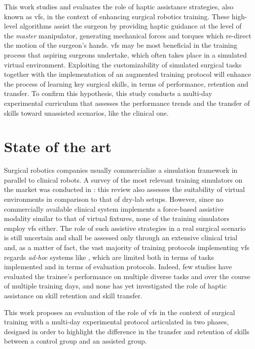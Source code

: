 \documentclass{article}
\begin{document}
\begin{multicols}{2}
This work studies and evaluates the role of haptic assistance strategies, also known as \acp{vf}, in the context of enhancing surgical robotics training. These high-level algorithms assist the surgeon by providing haptic guidance at the level of the \textit{master} manipulator, generating mechanical forces and torques which re-direct the motion of the surgeon's hands. \acp{vf} may be most beneficial in the training process that aspiring surgeons undertake, which often takes place in a simulated virtual environment. Exploiting the customizability of simulated surgical tasks together with the implementation of an augmented training protocol will enhance the process of learning key surgical skills, in terms of performance, retention and transfer. To confirm this hypothesis, this study conducts a multi-day experimental curriculum that assesses the performance trends and the transfer of skills toward unassisted scenarios, like the clinical one. 


\section{State of the art}
Surgical robotics companies usually commercialize a simulation framework in parallel to clinical robots. A survey of the most relevant training simulators on the market was conducted in \cite{Bric2016}: this review also assesses the suitability of virtual environments in comparison to that of dry-lab setups. However, since no commercially available clinical system implements a force-based assistive modality similar to that of virtual fixtures, none of the training simulators employ \acp{vf} either. The role of such assistive strategies in a real surgical scenario is still uncertain and shall be assessed only through an extensive clinical trial and, as a matter of fact, the vast majority of training protocols implementing \acp{vf} regards \textit{ad-hoc} systems like \cite{Lin2014}, which are limited both in terms of tasks implemented and in terms of evaluation protocols. Indeed, few studies \cite{Enayati2018} have evaluated the trainee's performance on multiple diverse tasks and over the course of multiple training days, and none has yet investigated the role of haptic assistance on skill retention and skill transfer. 

This work proposes an evaluation of the role of \acp{vf} in the context of surgical training with a multi-day experimental protocol articulated in two phases, designed in order to highlight the difference in the transfer and retention of skills between a control group and an assisted group. 

\end{multicols}
\end{document}
